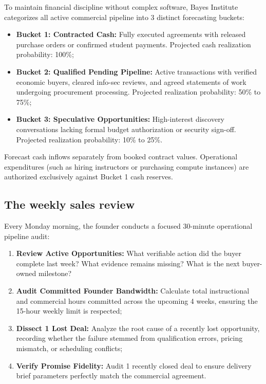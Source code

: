 To maintain financial discipline without complex software, Bayes Institute categorizes all active commercial pipeline into 3 distinct forecasting buckets:
\begin{itemize}
\item \textbf{Bucket 1: Contracted Cash:} Fully executed agreements with released purchase orders or confirmed student payments. Projected cash realization probability: 100\%;
\item \textbf{Bucket 2: Qualified Pending Pipeline:} Active transactions with verified economic buyers, cleared info-sec reviews, and agreed statements of work undergoing procurement processing. Projected realization probability: 50\% to 75\%;
\item \textbf{Bucket 3: Speculative Opportunities:} High-interest discovery conversations lacking formal budget authorization or security sign-off. Projected realization probability: 10\% to 25\%.
\end{itemize}
Forecast cash inflows separately from booked contract values. Operational expenditures (such as hiring instructors or purchasing compute instances) are authorized exclusively against Bucket 1 cash reserves.

\subsection{The weekly sales review}

Every Monday morning, the founder conducts a focused 30-minute operational pipeline audit:
\begin{enumerate}
\item \textbf{Review Active Opportunities:} What verifiable action did the buyer complete last week? What evidence remains missing? What is the next buyer-owned milestone?
\item \textbf{Audit Committed Founder Bandwidth:} Calculate total instructional and commercial hours committed across the upcoming 4 weeks, ensuring the 15-hour weekly limit is respected;
\item \textbf{Dissect 1 Lost Deal:} Analyze the root cause of a recently lost opportunity, recording whether the failure stemmed from qualification errors, pricing mismatch, or scheduling conflicts;
\item \textbf{Verify Promise Fidelity:} Audit 1 recently closed deal to ensure delivery brief parameters perfectly match the commercial agreement.
\end{enumerate}

